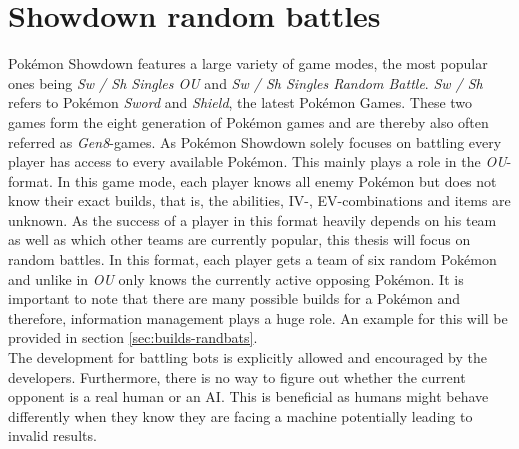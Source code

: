 \section{Showdown random battles}
\label{sec:showdown-background}
Pokémon Showdown features a large variety of game modes, the most popular ones being \textit{Sw / Sh Singles OU} and
\textit{Sw / Sh Singles Random Battle}. \textit{Sw / Sh} refers to Pokémon \textit{Sword} and \textit{Shield}, the latest
Pokémon Games. These two games form the eight generation of Pokémon games and are thereby also often referred as 
\textit{Gen8}-games. As Pokémon Showdown solely focuses
on battling every player has access to every available Pokémon. This mainly plays a role in the \textit{OU}-format.
In this game mode, each player knows all enemy Pokémon but does not know their exact builds, that is, the abilities,
\ac{IV}-, \ac{EV}-combinations and items are unknown. As the success of a player in this format heavily depends
on his team as well as which other teams are currently popular, this thesis will focus on random battles. In this 
format, each player gets a team of six random Pokémon and unlike in \textit{OU} only knows the currently active
opposing Pokémon. It is important to note that there are many possible builds for a Pokémon and therefore, information
management plays a huge role. An example for this will be provided in section \ref{sec:builds-randbats}. \\
The development for battling bots is explicitly allowed and encouraged by the developers. Furthermore, there is 
no way to figure out whether the current opponent is a real human or an AI. This is beneficial as humans
might behave differently when they know they are facing a machine potentially leading to invalid results. 

\label{sec:showdown-randbats}

